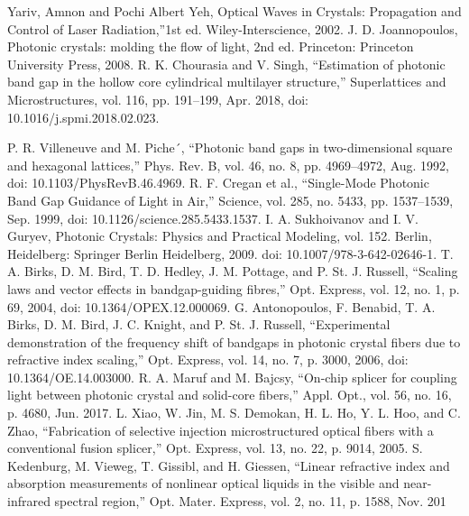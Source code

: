 \begin{thebibliography}{99}
 Yariv, Amnon and Pochi Albert Yeh, Optical Waves in Crystals: Propagation and Control of Laser Radiation,”1st ed. Wiley-Interscience, 2002.
 J. D. Joannopoulos, Photonic crystals: molding the flow of light, 2nd ed. Princeton: Princeton University Press, 2008.
R. K. Chourasia and V. Singh, “Estimation of photonic band gap in the hollow core cylindrical multilayer structure,” Superlattices and Microstructures, vol. 116, pp. 191–199, Apr. 2018, doi: 10.1016/j.spmi.2018.02.023.

 P. R. Villeneuve and M. Piche´, “Photonic band gaps in two-dimensional square and hexagonal lattices,” Phys. Rev. B, vol. 46, no. 8, pp. 4969–4972, Aug. 1992, doi: 10.1103/PhysRevB.46.4969.
R. F. Cregan et al., “Single-Mode Photonic Band Gap Guidance of Light in Air,” Science, vol. 285, no. 5433, pp. 1537–1539, Sep. 1999, doi: 10.1126/science.285.5433.1537.
 I. A. Sukhoivanov and I. V. Guryev, Photonic Crystals: Physics and Practical Modeling, vol. 152. Berlin, Heidelberg: Springer Berlin Heidelberg, 2009. doi: 10.1007/978-3-642-02646-1.
 T. A. Birks, D. M. Bird, T. D. Hedley, J. M. Pottage, and P. St. J. Russell, “Scaling laws and vector effects in bandgap-guiding fibres,” Opt. Express, vol. 12, no. 1, p. 69, 2004, doi: 10.1364/OPEX.12.000069.
 G. Antonopoulos, F. Benabid, T. A. Birks, D. M. Bird, J. C. Knight, and P. St. J. Russell, “Experimental demonstration of the frequency shift of bandgaps in photonic crystal fibers due to refractive index scaling,” Opt. Express, vol. 14, no. 7, p. 3000, 2006, doi: 10.1364/OE.14.003000.
 R. A. Maruf and M. Bajcsy, “On-chip splicer for coupling light between
photonic crystal and solid-core fibers,” Appl. Opt., vol. 56, no. 16, p.
4680, Jun. 2017.
 L. Xiao, W. Jin, M. S. Demokan, H. L. Ho, Y. L. Hoo, and C. Zhao,
“Fabrication of selective injection microstructured optical fibers with a
conventional fusion splicer,” Opt. Express, vol. 13, no. 22, p. 9014, 2005.
 S. Kedenburg, M. Vieweg, T. Gissibl, and H. Giessen, “Linear refractive
index and absorption measurements of nonlinear optical liquids in the
visible and near-infrared spectral region,” Opt. Mater. Express, vol. 2,
no. 11, p. 1588, Nov. 201


\end{thebibliography}

